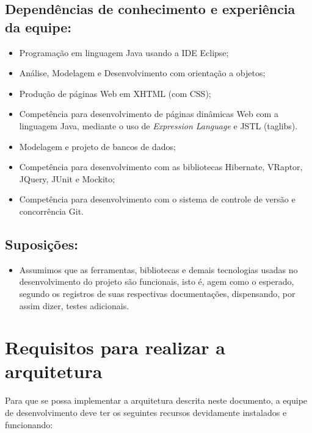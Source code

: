 \documentclass[11pt, a4paper]{article}
\begin{document}
        \subsection{Dependências de conhecimento e experiência da equipe:}
            \begin{itemize}
                \item Programação em linguagem Java usando a IDE Eclipse;
                
                \item Análise, Modelagem e Desenvolvimento com orientação a objetos;
                
                \item Produção de páginas Web em XHTML (com CSS);

	    \item Competência para desenvolvimento de páginas dinâmicas Web com a linguagem Java, mediante o uso de \emph{Expression Language} e JSTL (taglibs).
                
                \item Modelagem e projeto de bancos de dados;
                
                \item Competência para desenvolvimento com as bibliotecas Hibernate, VRaptor, JQuery, 
				JUnit e Mockito;
                
                \item Competência para desenvolvimento com o sistema de controle de versão e concorrência Git.
            \end{itemize}

        \subsection{Suposições:}
            \begin{itemize}
                \item Assumimos que as ferramentas, bibliotecas e demais
                tecnologias usadas no desenvolvimento do projeto são funcionais,
                isto é, agem como o esperado, segundo os registros de suas respectivas documentações, dispensando, por assim dizer, testes adicionais.
            \end{itemize}

    \section{Requisitos para realizar a arquitetura}
        Para que se possa implementar a arquitetura descrita neste documento, a
        equipe de desenvolvimento deve ter os seguintes recursos devidamente
        instalados e funcionando:
\end{document}
